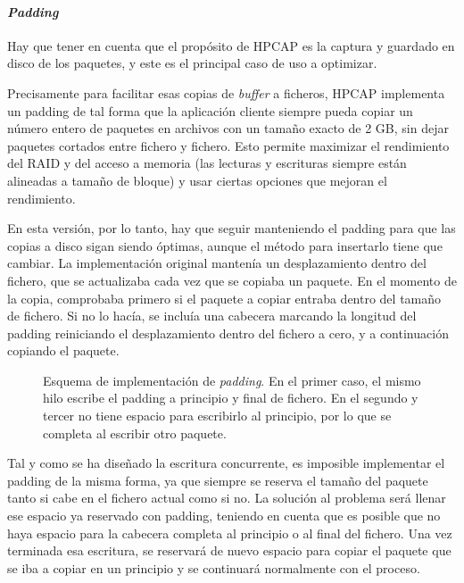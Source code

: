 \documentclass[oneside, draft]{epstfg}
\begin{document}
\paragraph{\textit{Padding}} Hay que tener en cuenta que el propósito de HPCAP es la captura y guardado en disco de los paquetes, y este es el principal caso de uso a optimizar.

Precisamente para facilitar esas copias de \textit{buffer} a ficheros, HPCAP implementa un \gls{padding} \cite{MorenoTFM2012} de tal forma que la aplicación cliente siempre pueda copiar un número entero de paquetes en archivos con un tamaño exacto de 2 GB, sin dejar paquetes cortados entre fichero y fichero. Esto permite maximizar el rendimiento del \gls{RAID} y del acceso a memoria (las lecturas y escrituras siempre están alineadas a tamaño de bloque) y usar ciertas opciones que mejoran el rendimiento.

En esta versión, por lo tanto, hay que seguir manteniendo el \gls{padding} para que las copias a disco sigan siendo óptimas, aunque el método para insertarlo tiene que cambiar. La implementación original mantenía un desplazamiento dentro del fichero, que se actualizaba cada vez que se copiaba un paquete. En el momento de la copia, comprobaba primero si el paquete a copiar entraba dentro del tamaño de fichero. Si no lo hacía, se incluía una cabecera marcando la longitud del \gls{padding} reiniciando el desplazamiento dentro del fichero a cero, y a continuación copiando el paquete.

\begin{figure}[tbp]
\centering

\caption[Esquema de implementación del \textit{padding} en el \textit{buffer} intermedio]{Esquema de implementación de \textit{padding}. En el primer caso, el mismo hilo escribe el \gls{padding} a principio y final de fichero. En el segundo y tercer no tiene espacio para escribirlo al principio, por lo que se completa al escribir otro paquete.}
\label{fig:BufferPadding}
\end{figure}

Tal y como se ha diseñado la escritura concurrente, es imposible implementar el \gls{padding} de la misma forma, ya que siempre se reserva el tamaño del paquete tanto si cabe en el fichero actual como si no. La solución al problema será llenar ese espacio ya reservado con \gls{padding}, teniendo en cuenta que es posible que no haya espacio para la cabecera completa al principio o al final del fichero. Una vez terminada esa escritura, se reservará de nuevo espacio para copiar el paquete que se iba a copiar en un principio y se continuará normalmente con el proceso.
\end{document}
